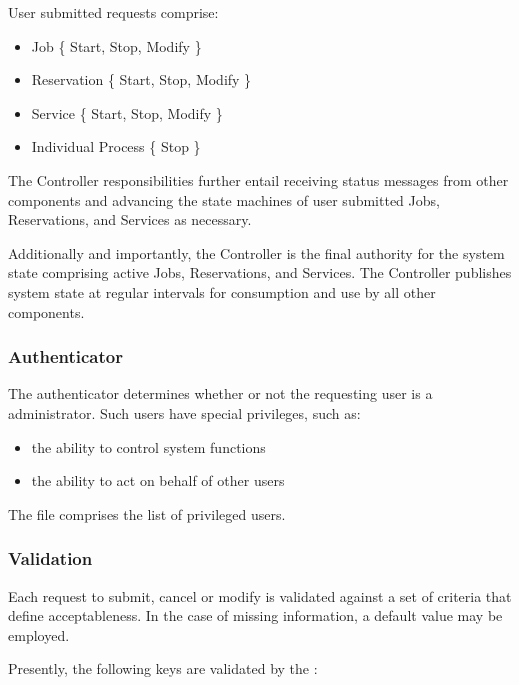     User submitted requests comprise:
    
    \begin{itemize}
      \item Job \{ Start, Stop, Modify \}
      \item Reservation \{ Start, Stop, Modify \}
      \item Service \{ Start, Stop, Modify \}
      \item Individual Process \{ Stop \}
    \end{itemize} 
    
    The Controller responsibilities further entail receiving status messages
    from other \varDUCC components and advancing the state machines of user 
    submitted Jobs, Reservations, and Services as necessary. 
    
    Additionally and importantly, the Controller is the final authority
    for the \varDUCC system state comprising active Jobs, Reservations, and 
    Services. The Controller publishes \varDUCC system state at regular intervals
    for consumption and use by all other \varDUCC components.
    
    \subsubsection{Authenticator} 
    
    The authenticator determines whether or not the requesting user is a
    \varDUCC administrator. Such users have special privileges, such as:
    
    \begin{itemize}
      \item the ability to control \varDUCC system functions
      \item the ability to act on behalf of other users
    \end{itemize}     
    
    The file \varDuccAdministrators comprises the list of privileged \varDUCC users.
    
    \subsubsection{Validation} 
    
    Each request to submit, cancel or modify is validated against a set of
    criteria that define acceptableness. In the case of missing information,
    a default value may be employed.
    
    Presently, the following keys are validated by the \varOrchestrator:
    
